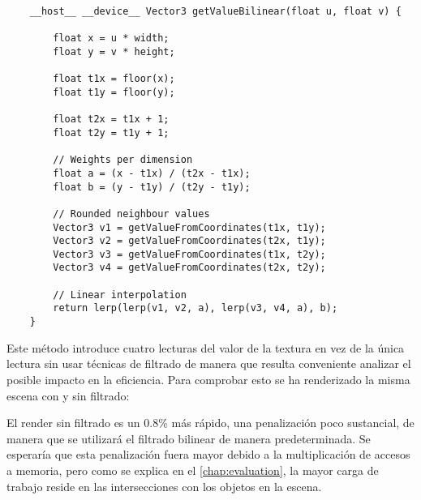 \begin{minipage}[c]{0.95\textwidth}
\begin{lstlisting}
	__host__ __device__ Vector3 getValueBilinear(float u, float v) {
        
        float x = u * width;
        float y = v * height;

        float t1x = floor(x);
        float t1y = floor(y);

        float t2x = t1x + 1;
        float t2y = t1y + 1;

		// Weights per dimension
        float a = (x - t1x) / (t2x - t1x);
        float b = (y - t1y) / (t2y - t1y);

		// Rounded neighbour values
        Vector3 v1 = getValueFromCoordinates(t1x, t1y);
        Vector3 v2 = getValueFromCoordinates(t2x, t1y);
        Vector3 v3 = getValueFromCoordinates(t1x, t2y);
        Vector3 v4 = getValueFromCoordinates(t2x, t2y);

		// Linear interpolation
        return lerp(lerp(v1, v2, a), lerp(v3, v4, a), b);
	}
\end{lstlisting}
\end{minipage}	

Este método introduce cuatro lecturas del valor de la textura en vez de la única lectura sin usar técnicas de filtrado de manera que resulta conveniente analizar el posible impacto en la eficiencia. Para comprobar esto se ha renderizado la misma escena con y sin filtrado:

		

	
El render sin filtrado es un 0.8\% más rápido, una penalización poco sustancial, de manera que se utilizará el filtrado bilinear de manera predeterminada. Se esperaría que esta penalización fuera mayor debido a la multiplicación de accesos a memoria, pero como se explica en el \autoref{chap:evaluation}, la mayor carga de trabajo reside en las intersecciones con los objetos en la escena.
	

